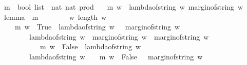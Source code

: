 \begin{isabellebody}
\isanewline
{}\isamarkupfalse%
\ m\ {\isacharcolon}{\isacharcolon}\ {\isachardoublequoteopen}bool\ list\ {\isasymRightarrow}\ {\isacharparenleft}nat{\isacharcomma}\ nat{\isacharparenright}\ prod{\isachardoublequoteclose}\ \isanewline
\ \ {\isachardoublequoteopen}m\ w\ {\isacharequal}\ {\isacharparenleft}lambda{\isacharunderscore}of{\isacharunderscore}string\ w{\isacharcomma}\ margin{\isacharunderscore}of{\isacharunderscore}string\ w{\isacharparenright}{\isachardoublequoteclose}\isanewline
\ \ \isanewline
{}\isamarkupfalse%
\ lemma{\isacharunderscore}{}{\isacharunderscore}{}{}\ {\isacharcolon}\ {\isachardoublequoteopen}{\isacharparenleft}m\ {\isacharbrackleft}{\isacharbrackright}\ {\isacharequal}\ {\isacharparenleft}{}{\isacharcomma}{}{\isacharparenright}{\isacharparenright}\ {\isasymand}\ \isanewline
\ \ {\isacharparenleft}{\isasymforall}\ w{\isachardot}\ {\isacharparenleft}{\isacharparenleft}length\ w\ {\isachargreater}\ {}{\isacharparenright}\ {\isasymlongrightarrow}\ {\isacharparenleft}\ \isanewline
\ \ \ \ {\isacharparenleft}m\ {\isacharparenleft}w\ {\isacharat}\ {\isacharbrackleft}True{\isacharbrackright}{\isacharparenright}\ {\isacharequal}\ {\isacharparenleft}lambda{\isacharunderscore}of{\isacharunderscore}string\ w\ {\isacharplus}\ {}{\isacharcomma}\ margin{\isacharunderscore}of{\isacharunderscore}string\ w\ {\isacharplus}\ {}{\isacharparenright}{\isacharparenright}\ \isanewline
\ \ \ \ \ {\isasymand}\ \ \ {\isacharparenleft}{\isacharparenleft}lambda{\isacharunderscore}of{\isacharunderscore}string\ w\ {\isachargreater}\ margin{\isacharunderscore}of{\isacharunderscore}string\ w{\isacharparenright}\ {\isasymand}\ {\isacharparenleft}margin{\isacharunderscore}of{\isacharunderscore}string\ w\ {\isacharequal}\ {}{\isacharparenright}\isanewline
\ \ \ \ \ \ \ \ \ \ {\isasymlongrightarrow}\ {\isacharparenleft}m\ {\isacharparenleft}w\ {\isacharat}\ {\isacharbrackleft}False{\isacharbrackright}{\isacharparenright}\ {\isacharequal}\ {\isacharparenleft}lambda{\isacharunderscore}of{\isacharunderscore}string\ w\ {\isacharminus}\ {}{\isacharcomma}\ {}{\isacharparenright}{\isacharparenright}{\isacharparenright}\isanewline
\ \ \ \ \ {\isasymand}\ \ \ {\isacharparenleft}lambda{\isacharunderscore}of{\isacharunderscore}string\ w\ {\isacharequal}\ {}\ {\isasymlongrightarrow}\ {\isacharparenleft}m\ {\isacharparenleft}w\ {\isacharat}\ {\isacharbrackleft}False{\isacharbrackright}{\isacharparenright}\ {\isacharequal}\ {\isacharparenleft}{}{\isacharcomma}\ margin{\isacharunderscore}of{\isacharunderscore}string\ w\ {\isacharminus}\ {}{\isacharparenright}{\isacharparenright}{\isacharparenright}\isanewline

\end{isabellebody}

